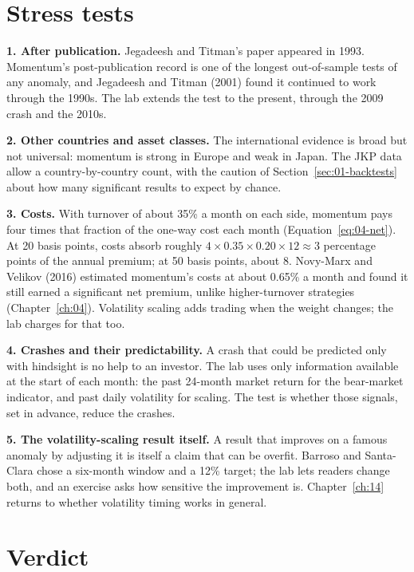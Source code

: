 \section{Stress tests}
\label{sec:06-stress}

\textbf{1. After publication.} Jegadeesh and Titman's paper appeared in 1993. Momentum's post-publication record is one of the longest out-of-sample tests of any anomaly, and Jegadeesh and Titman (2001) found it continued to work through the 1990s. The lab extends the test to the present, through the 2009 crash and the 2010s.

\textbf{2. Other countries and asset classes.} The international evidence is broad but not universal: momentum is strong in Europe and weak in Japan. The JKP data allow a country-by-country count, with the caution of Section~\ref{sec:01-backtests} about how many significant results to expect by chance.

\textbf{3. Costs.} With turnover of about 35\% a month on each side, momentum pays four times that fraction of the one-way cost each month (Equation~\eqref{eq:04-net}). At 20 basis points, costs absorb roughly $4 \times 0.35 \times 0.20 \times 12 \approx 3$ percentage points of the annual premium; at 50 basis points, about 8. Novy-Marx and Velikov (2016) estimated momentum's costs at about 0.65\% a month and found it still earned a significant net premium, unlike higher-turnover strategies (Chapter~\ref{ch:04}). Volatility scaling adds trading when the weight changes; the lab charges for that too.

\textbf{4. Crashes and their predictability.} A crash that could be predicted only with hindsight is no help to an investor. The lab uses only information available at the start of each month: the past 24-month market return for the bear-market indicator, and past daily volatility for scaling. The test is whether those signals, set in advance, reduce the crashes.

\textbf{5. The volatility-scaling result itself.} A result that improves on a famous anomaly by adjusting it is itself a claim that can be overfit. Barroso and Santa-Clara chose a six-month window and a 12\% target; the lab lets readers change both, and an exercise asks how sensitive the improvement is. Chapter~\ref{ch:14} returns to whether volatility timing works in general.

\section{Verdict}
\label{sec:06-verdict}

